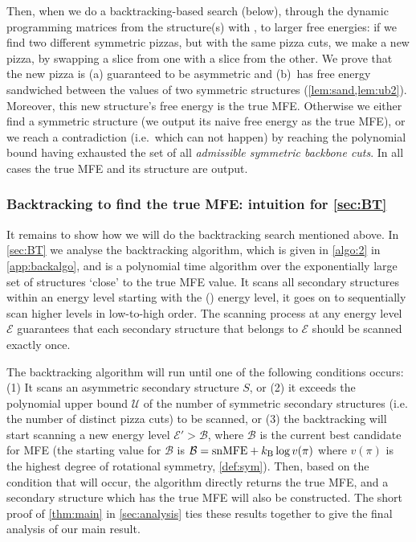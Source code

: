 Then, when we do a backtracking-based search (below), 
through the dynamic programming matrices from the structure(s) with \snMFE, to larger free energies:  
if we find two different symmetric pizzas, but with the same pizza cuts,  we make a new pizza, by swapping a slice from one with a slice from the other.  
We prove that the new pizza is (a) guaranteed to be asymmetric and (b)~has free energy sandwiched between the {\snMFE} values of  two symmetric structures  (\cref{lem:sand,lem:ub2}). 
Moreover, this new structure's free energy is the true MFE. 
Otherwise we either find a symmetric structure (we output its naive free energy as the true MFE), or we reach a contradiction (i.e.~which can not happen) by reaching the polynomial bound having exhausted the set of all \emph{admissible symmetric backbone cuts}. In all cases the true MFE and its structure are output. 




\subsubsection{Backtracking to find the true MFE: intuition for \cref{sec:BT}} 

It remains to show how we will do the backtracking search mentioned above. 
In \cref{sec:BT} we analyse the  backtracking algorithm, which is given in \cref{algo:2} in \cref{app:backalgo}, and  
is a polynomial time  algorithm over the exponentially large set of structures `close' to the true MFE value. 
It scans all secondary structures within an energy level starting with the \symnMFE (\snMFE) energy level, it goes on to sequentially scan higher levels in low-to-high order. 
The scanning process at any energy level $\mathcal{E}$  guarantees that each secondary structure that belongs to $\mathcal{E}$ should be scanned exactly once. 

The backtracking algorithm will run until one of the following conditions occurs:
(1) It scans an asymmetric secondary structure $S$, or 
(2) it exceeds the polynomial upper bound $\mathcal{U}$ of the number of symmetric secondary structures (i.e. the number of distinct  pizza cuts) to be scanned, or 
(3) the backtracking will start scanning a new energy level $\mathcal{E}' > \mathcal{B}$, where $\mathcal{B}$ is the current best candidate for MFE (the starting value for $\mathcal{B}$ is  $\mathcal{B} = \mathrm{snMFE} + k_\mathrm{B} \log v(\pi)$ where $v(\pi)$ is the highest degree of rotational symmetry, \cref{def:sym}). 
Then, based on the condition that will occur, the algorithm directly returns the true MFE, and a secondary structure which has the true MFE will also be constructed. 
The short proof of \cref{thm:main} in \cref{sec:analysis} ties these results together to give the final analysis of our main result.


